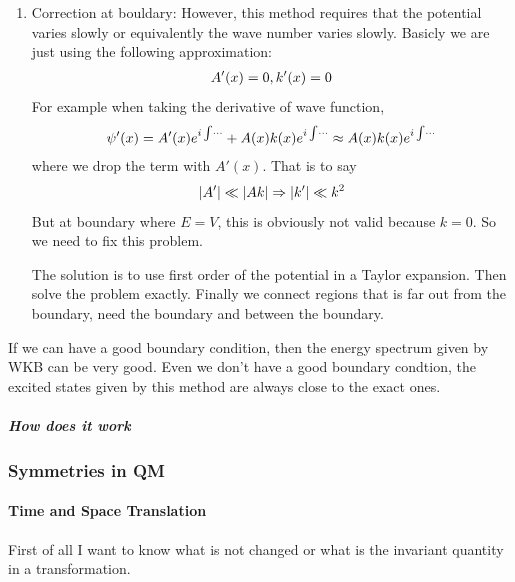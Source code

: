 \documentclass[letterpaper,10pt,english]{sphinxmanual}
\begin{document}
\begin{enumerate}
\item {} 
Correction at bouldary:
However, this method requires that the potential varies slowly or equivalently the wave number varies slowly. Basicly we are just using the following approximation:
\begin{gather}
\begin{split}A'(x) = 0, k'(x) = 0\end{split}\notag
\end{gather}
For example when taking the derivative of wave function,
\begin{gather}
\begin{split}\psi'(x) = A'(x) e^{i\int \cdots} + A(x) k(x) e^{i\int \cdots} \approx A(x) k(x) e^{i\int \cdots}\end{split}\notag
\end{gather}
where we drop the term with \(A'(x)\). That is to say
\begin{gather}
\begin{split}|A'|\ll |A k| \Rightarrow |k'| \ll k^2\end{split}\notag
\end{gather}
But at boundary where \(E = V\), this is obviously not valid because \(k=0\). So we need to fix this problem.

The solution is to use first order of the potential in a Taylor expansion. Then solve the problem exactly. Finally we connect regions that is far out from the boundary, need the boundary and between the boundary.

\end{enumerate}

If we can have a good boundary condition, then the energy spectrum given by WKB can be very good. Even we don't have a good boundary condtion, the excited states given by this method are always close to the exact ones.


\subparagraph{How does it work}
\label{Quantum/approx:how-does-it-work}

\subsubsection{Symmetries in QM}
\label{Quantum/symmetries::doc}\label{Quantum/symmetries:symmetries-in-qm}

\paragraph{Time and Space Translation}
\label{Quantum/symmetries:time-and-space-translation}
First of all I want to know what is not changed or what is the invariant quantity in a transformation.
\end{document}
